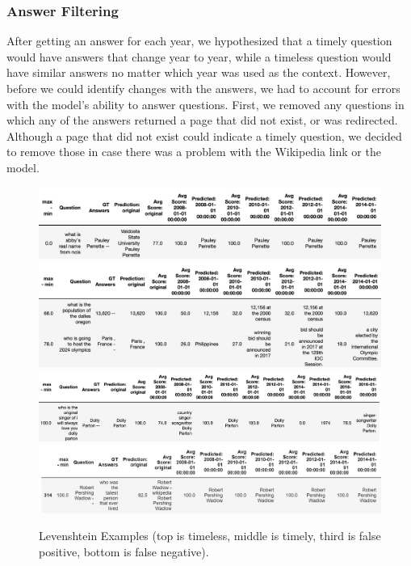 \documentclass{article}
\begin{document}
\subsubsection{Answer Filtering}
After getting an answer for each year, we hypothesized that a timely question would have answers that change year to year, while a timeless question would have similar answers no matter which year was used as the context. However, before we could identify changes with the answers, we had to account for errors with the model’s ability to answer questions. First, we removed any questions in which any of the answers returned a page that did not exist, or was redirected. Although a page that did not exist could indicate a timely question, we decided to remove those in case there was a problem with the Wikipedia link or the model. \begin{figure}[ht]
    \begin{center}
        \includegraphics[width=5in]{timeless leven.png}
        \includegraphics[width=5in]{timely leven.png}
        \includegraphics[width=5in]{leven false pos.png}
        \includegraphics[width=5in]{leven_false_neg.PNG}
	\end{center}  
  \caption{Levenshtein Examples (top is timeless, middle is timely, third is false positive, bottom is false negative).}
  \label{fig:levenshtein_examples}
\end{figure}
\end{document}
